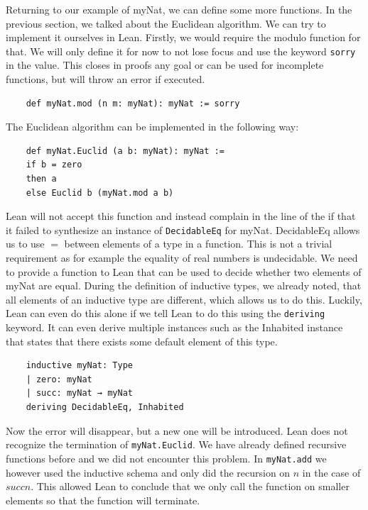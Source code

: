 Returning to our example of myNat, we can define some more functions. In the previous section, we talked about the Euclidean algorithm. We can try to implement it ourselves in Lean. Firstly, we would require the modulo function for that. We will only define it for now to not lose focus and use the keyword \lstinline|sorry| in the value. This closes in proofs any goal or can be used for incomplete functions, but will throw an error if executed.

\begin{lstlisting}
    def myNat.mod (n m: myNat): myNat := sorry
\end{lstlisting}

The Euclidean algorithm can be implemented in the following way:

\begin{lstlisting}
    def myNat.Euclid (a b: myNat): myNat :=
    if b = zero
    then a
    else Euclid b (myNat.mod a b)
\end{lstlisting}

Lean will not accept this function and instead complain in the line of the if that it failed to synthesize an instance of \lstinline|DecidableEq| for myNat. DecidableEq allows us to use $=$ between elements of a type in a function. This is not a trivial requirement as for example the equality of real numbers is undecidable\cite{EqualityRealNumber}. We need to provide a function to Lean that can be used to decide whether two elements of myNat are equal. During the definition of inductive types, we already noted, that all elements of an inductive type are different, which allows us to do this. Luckily, Lean can even do this alone if we tell Lean to do this using the \lstinline|deriving| keyword. It can even derive multiple instances such as the Inhabited instance that states that there exists some default element of this type.

\begin{lstlisting}
    inductive myNat: Type
    | zero: myNat
    | succ: myNat → myNat
    deriving DecidableEq, Inhabited

\end{lstlisting}

Now the error will disappear, but a new one will be introduced. Lean does not recognize the termination of \lstinline|myNat.Euclid|. We have already defined recursive functions before and we did not encounter this problem. In \lstinline|myNat.add| we however used the inductive schema and only did the recursion on $n$ in the case of $succ n$. This allowed Lean to conclude that we only call the function on smaller elements so that the function will terminate.


